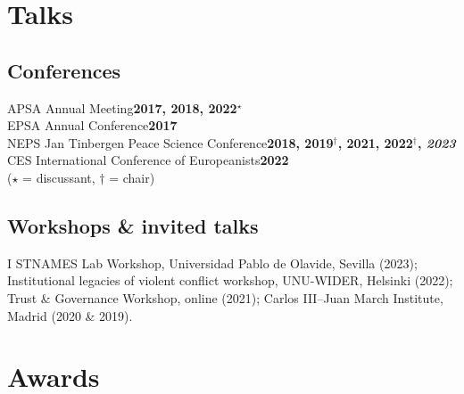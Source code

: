 \documentclass[a4paper, 12pt]{article}
\begin{document}
\section*{Talks}

\subsection*{Conferences}

\noindent
APSA Annual Meeting\hfill\textbf{2017, 2018, 2022$^\star$}\\
EPSA Annual Conference\hfill\textbf{2017}\\
NEPS Jan Tinbergen Peace Science Conference\hfill\textbf{2018, 2019$^\dagger$, 2021, 2022$^\dagger$, \textit{2023}}\\
CES International Conference of Europeanists\hfill\textbf{2022}\\\vspace{15pt}
\hfill{\footnotesize ($\star$ = discussant, $\dagger$ = chair)}

\vspace{-20pt}

\subsection*{Workshops \& invited talks}

I STNAMES Lab Workshop, Universidad Pablo de Olavide, Sevilla (2023); Institutional legacies of violent conflict workshop, UNU-WIDER, Helsinki (2022); Trust \& Governance Workshop, online (2021); Carlos III--Juan March Institute, Madrid (2020 \& 2019).

\section*{Awards}

\end{document}
